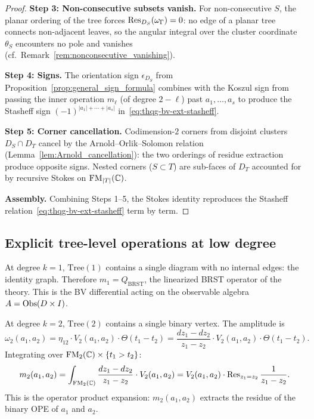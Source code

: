\begin{proof}
\medskip\noindent\textbf{Step 3: Non-consecutive subsets vanish.}
For non-consecutive $S$, the planar ordering of the tree forces
$\operatorname{Res}_{D_S}(\omega_\Gamma) = 0$: no edge of a planar tree
connects non-adjacent leaves, so the angular integral over the
cluster coordinate $\theta_S$ encounters no pole and vanishes
(cf.\ Remark~\ref{rem:nonconsecutive_vanishing}).

\medskip\noindent\textbf{Step 4: Signs.}
The orientation sign $\epsilon_{D_S}$ from
Proposition~\ref{prop:general_sign_formula} combines with the
Koszul sign from passing the inner operation $m_\ell$ (of degree
$2 - \ell$) past $a_1, \ldots, a_s$ to produce the Stasheff sign
$(-1)^{|a_1| + \cdots + |a_s|}$ in~\eqref{eq:thqg-bv-ext-stasheff}.

\medskip\noindent\textbf{Step 5: Corner cancellation.}
Codimension-$2$ corners from disjoint clusters
$D_S \cap D_T$ cancel by the Arnold--Orlik--Solomon relation
(Lemma~\ref{lem:Arnold_cancellation}): the two orderings of
residue extraction produce opposite signs. Nested corners
($S \subset T$) are sub-faces of $D_T$ accounted for by
recursive Stokes on $\operatorname{FM}_{|T|}(\mathbb{C})$.

\medskip\noindent\textbf{Assembly.}
Combining Steps 1--5, the Stokes identity reproduces the Stasheff
relation~\eqref{eq:thqg-bv-ext-stasheff} term by term.
\end{proof}


\subsection{Explicit tree-level operations at low degree}

\begin{example}
At degree $k = 1$, $\mathrm{Tree}(1)$ contains a single diagram
with no internal edges: the identity graph. Therefore
$m_1 = Q_{\mathrm{BRST}}$, the linearized BRST operator of the
theory. This is the BV differential acting on the observable
algebra $A = \operatorname{Obs}(D \times I)$.
\end{example}

\begin{example}
At degree $k = 2$, $\mathrm{Tree}(2)$ contains a single binary
vertex. The amplitude is
\[
\omega_2(a_1, a_2)
= \eta_{12} \cdot V_2(a_1, a_2) \cdot \Theta(t_1 - t_2)
= \frac{dz_1 - dz_2}{z_1 - z_2}
\cdot V_2(a_1, a_2) \cdot \Theta(t_1 - t_2).
\]
Integrating over $\operatorname{FM}_2(\mathbb{C}) \times \{t_1 > t_2\}$:
\[
m_2(a_1, a_2)
= \int_{\operatorname{FM}_2(\mathbb{C})}
\frac{dz_1 - dz_2}{z_1 - z_2}
\cdot V_2(a_1, a_2)
= V_2(a_1, a_2) \cdot
 \operatorname{Res}_{z_1 = z_2} \frac{1}{z_1 - z_2}.
\]
This is the operator product expansion: $m_2(a_1, a_2)$ extracts
the residue of the binary OPE of $a_1$ and $a_2$.
\end{example}


